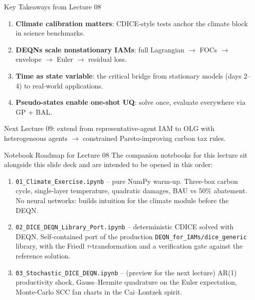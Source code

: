 \documentclass[aspectratio=169,11pt]{beamer}
\newcommand{\emphc}[1]{\textcolor{harvardcrimson}{#1}}
\begin{document}
\begin{frame}{Key Takeaways from Lecture 08}
\begin{enumerate}
    \item \textbf{Climate calibration matters}: CDICE-style tests anchor the climate block in science benchmarks.
    \item \textbf{DEQNs scale nonstationary IAMs}: full Lagrangian $\rightarrow$ FOCs $\rightarrow$ envelope $\rightarrow$ Euler $\rightarrow$ residual loss.
    \item \textbf{Time as state variable}: the critical bridge from stationary models (days 2--4) to real-world applications.
    \item \textbf{Pseudo-states enable one-shot UQ}: solve once, evaluate everywhere via GP + BAL.
\end{enumerate}

\vspace{0.3cm}
\begin{block}{Next}
Lecture 09: extend from representative-agent IAM to \emphc{OLG with heterogeneous agents} $\rightarrow$ constrained Pareto-improving carbon tax rules.
\end{block}
\end{frame}

\begin{frame}{Notebook Roadmap for Lecture 08}
\small
The companion notebooks for this lecture sit alongside this slide deck and are intended to be opened in this order:
\vspace{0.2cm}
\begin{enumerate}
    \item \texttt{01\_Climate\_Exercise.ipynb} -- pure NumPy warm-up. Three-box carbon cycle, single-layer temperature, quadratic damages, BAU vs 50\% abatement. No neural networks: builds intuition for the climate module before the DEQN.
    \item \texttt{02\_DICE\_DEQN\_Library\_Port.ipynb} -- deterministic CDICE solved with DEQN. Self-contained port of the production \texttt{DEQN\_for\_IAMs/dice\_generic} library, with the Friedl $\tau$-transformation and a verification gate against the reference solution.
    \item \texttt{03\_Stochastic\_DICE\_DEQN.ipynb} -- (preview for the next lecture) AR(1) productivity shock, Gauss--Hermite quadrature on the Euler expectation, Monte-Carlo SCC fan charts in the Cai--Lontzek spirit.
\end{enumerate}
\end{frame}
\end{document}
